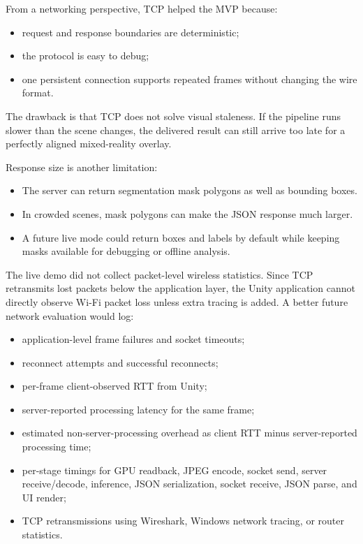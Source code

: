 \documentclass[11pt]{article}
\begin{document}
From a networking perspective, TCP helped the MVP because:

\begin{itemize}
    \item request and response boundaries are deterministic;
    \item the protocol is easy to debug;
    \item one persistent connection supports repeated frames without changing the wire format.
\end{itemize}

The drawback is that TCP does not solve visual staleness. If the pipeline runs slower than the scene changes, the delivered result can still arrive too late for a perfectly aligned mixed-reality overlay.

Response size is another limitation:

\begin{itemize}
    \item The server can return segmentation mask polygons as well as bounding boxes.
    \item In crowded scenes, mask polygons can make the JSON response much larger.
    \item A future live mode could return boxes and labels by default while keeping masks available for debugging or offline analysis.
\end{itemize}

The live demo did not collect packet-level wireless statistics. Since TCP retransmits lost packets below the application layer, the Unity application cannot directly observe Wi-Fi packet loss unless extra tracing is added. A better future network evaluation would log:

\begin{itemize}
    \item application-level frame failures and socket timeouts;
    \item reconnect attempts and successful reconnects;
    \item per-frame client-observed RTT from Unity;
    \item server-reported processing latency for the same frame;
    \item estimated non-server-processing overhead as client RTT minus server-reported processing time;
    \item per-stage timings for GPU readback, JPEG encode, socket send, server receive/decode, inference, JSON serialization, socket receive, JSON parse, and UI render;
    \item TCP retransmissions using Wireshark, Windows network tracing, or router statistics.
\end{itemize}
\end{document}
